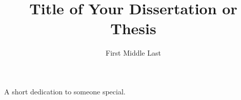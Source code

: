 \documentclass[12pt]{report}
\author{First Middle Last}                        %
\title{Title of Your Dissertation or Thesis}      %
\begin{document}

\copyrightpage

\commcertpage
\titlepage


\begin{dedication} %
A short dedication to someone special.
\end{dedication}

\begin{acknowledgments} %

\end{acknowledgments}

\utabstract %
\indent



\tableofcontents
\listoftables
\listoffigures







\appendices     %









\printindex

\begin{vita} %
\noindent

\end{vita}
\end{document}

